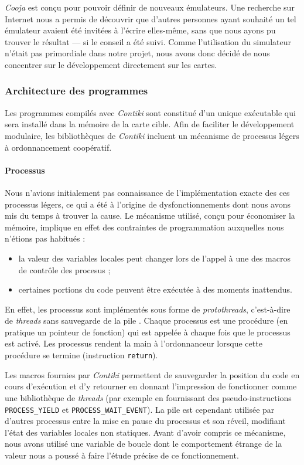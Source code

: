 \emph{Cooja} est conçu pour pouvoir définir de nouveaux émulateurs.
Une recherche sur Internet nous a permis de découvrir que d’autres personnes ayant souhaité un tel émulateur avaient été invitées à l’écrire elles-même, sans que nous ayons pu trouver le résultat — si le conseil a été suivi.
Comme l’utilisation du simulateur n’était pas primordiale dans notre projet, nous avons donc décidé de nous concentrer sur le développement directement sur les cartes.

\subsubsection{Architecture des programmes}

Les programmes compilés avec \emph{Contiki} sont constitué d’un unique exécutable qui sera installé dans la mémoire de la carte cible.
Afin de faciliter le développement modulaire, les bibliothèques de \emph{Contiki} incluent un mécanisme de processus légers à ordonnancement coopératif.

\paragraph{Processus}

Nous n’avions initialement pas connaissance de l’implémentation exacte des ces processus légers, ce qui a été à l’origine de dysfonctionnements dont nous avons mis du temps à trouver la cause.
Le mécanisme utilisé, conçu pour économiser la mémoire, implique en effet des contraintes de programmation auxquelles nous n’étions pas habitués :
\begin{itemize}
	\item la valeur des variables locales peut changer lors de l’appel à une des macros de contrôle des procesus ;
	\item certaines portions du code peuvent être exécutée à des moments inattendus.
\end{itemize}

En effet, les processus sont implémentés sous forme de \emph{protothreads}, c’est-à-dire de \emph{threads} sans sauvegarde de la pile .
Chaque processus est une procédure (en pratique un pointeur de fonction) qui est appelée à chaque fois que le processus est activé.
Les processus rendent la main à l’ordonnanceur lorsque cette procédure se termine (instruction \texttt{return}).

Les macros fournies par \emph{Contiki} permettent de sauvegarder la position du code en cours d’exécution et d’y retourner en donnant l’impression de fonctionner comme une bibliothèque de \emph{threads} (par exemple en fournissant des pseudo-instructions \texttt{PROCESS\_YIELD} et \texttt{PROCESS\_WAIT\_EVENT}).
La pile est cependant utilisée par d’autres processus entre la mise en pause du processus et son réveil, modifiant l’état des variables locales non statiques.
Avant d’avoir compris ce mécanisme, nous avons utilisé une variable de boucle dont le comportement étrange de la valeur nous a poussé à faire l’étude précise de ce fonctionnement.
\label{variables-locales}

